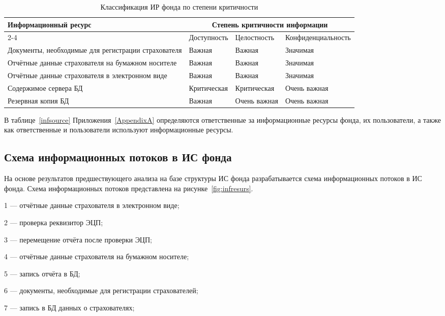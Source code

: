 \begin{table}[h]
\caption{Классификация ИР фонда по степени критичности}
\label{tab:inf_resource}
\small
\begin{tabular}{|p{5cm}|p{3cm}|p{3cm}|p{3cm}|}
\hline
\multirow{3}{4cm}{Информационный ресурс} & \multicolumn{3}{c|}{Степень
  критичности информации}\\\cline{2-4}
& Доступность & Целостность & Конфиденциаль\-ность \\\hline
Документы, необходимые для регистрации страхователя & Важная & Важная
& Значимая\\\hline
Отчётные данные страхователя на бумажном носителе & Важная & Важная &
Значимая \\\hline
Отчётные данные страхователя в электронном виде & Важная & Важная &
Значимая \\\hline
Содержимое сервера БД & Критическая & Критическая & Очень важная
\\\hline
Резервная копия БД & Важная & Очень важная & Очень важная
\\\hline
\end{tabular}
\end{table}
\normalsize

\point В таблице~\ref{infsource} Приложения~\ref{AppendixA} определяются
ответственные за информационные ресурсы фонда, их пользователи, а
также как ответственные и пользователи используют информационные
ресурсы.

\subsection{Схема информационных потоков в ИС фонда}

На основе результатов предшествующего анализа на базе структуры ИС
фонда разрабатывается схема информационных потоков в ИС фонда. Схема
информационных потоков представлена на рисунке~\ref{fig:infresurs}.

1 --- отчётные данные страхователя в электронном виде;

2 --- проверка реквизитор ЭЦП;

3 --- перемещение отчёта после проверки ЭЦП;

4 --- отчётные данные страхователя на бумажном носителе;

5 --- запись отчёта в БД;

6 --- документы, необходимые для регистрации страхователей;

7 --- запись в БД данных о страхователях;

